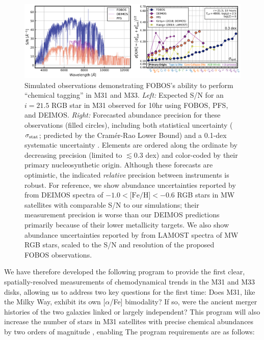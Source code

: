 \documentclass[11pt,a4paper,twoside,onecolumn,openany,final,oldfontcommands]{memoir}
\begin{document}
\begin{figure}
\includegraphics[width=1.0\textwidth]{figs/abundances_snr_v6.png}
\caption[Simulated M31 RGB spectra and abundance forecasts]{Simulated observations demonstrating FOBOS's ability to perform ``chemical tagging'' in M31 and M33. \textit{Left:} Expected S/N for an $i=21.5$ RGB star in M31 observed for 10hr using FOBOS, PFS, and DEIMOS. \textit{Right:}  Forecasted abundance precision for these observations (filled circles), including both statistical uncertainty ($\sigma_{\rm stat}$; predicted by the Cram\'er-Rao Lower Bound) and a 0.1-dex systematic uncertainty \citep[$\sigma_{\rm syst}$; cf.,][]{kirby18, xiang2019}. Elements are ordered along the ordinate by decreasing precision (limited to $\lesssim$0.3 dex) and color-coded by their primary nucleosynthetic origin. Although these forecasts are optimistic, the indicated \textit{relative} precision between instruments is robust. For reference, we show abundance uncertainties reported by \citet[][purple squares]{kirby18} from DEIMOS spectra of $-1.0<\text{[Fe/H]}<-0.6$ RGB stars in MW satellites with comparable S/N to our simulations; their measurement precision is worse than our DEIMOS predictions primarily because of their lower metallicity targets.  We also show abundance uncertainties reported by \citet[][yellow squares]{xiang2019} from LAMOST spectra of MW RGB stars, scaled to the S/N and resolution of the proposed FOBOS  observations.}
\label{fig:abundances_snr}
\end{figure}

We have therefore developed the following program to provide the first clear, spatially-resolved measurements of chemodynamical trends in the M31 and M33 disks, allowing us to address two key questions for the first time: Does M31, like the Milky Way, exhibit its own [$\alpha$/Fe] bimodality?  If so, were the ancient merger histories of the two galaxies linked or largely independent? This program will also increase the number of stars in M31 satellites with precise chemical abundances by two orders of magnitude , enabling  The program requirements are as follows:
\end{document}
